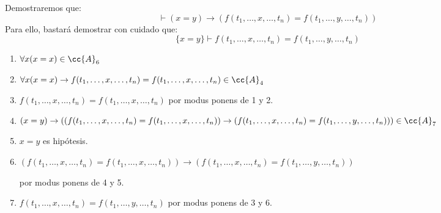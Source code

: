 \begin{ejemplo}
    Demostraremos que:
    \begin{equation*}
        \vdash (x=y) \to (f(t_1,\ldots,x,\ldots,t_n) = f(t_1,\ldots,y,\ldots,t_n))
    \end{equation*}
    Para ello, bastará demostrar con cuidado que:
    \begin{equation*}
        \{x=y\} \vdash f(t_1,\ldots,x,\ldots,t_n) = f(t_1,\ldots,y,\ldots,t_n)
    \end{equation*}
    \begin{enumerate}
        \item $\forall x(x=x)\in \cc{A}_6$ 
        \item $\forall x(x=x)\to f(t_1,\dots,x,\dots,t_n)=f(t_1,\dots,x,\dots,t_n)\in \cc{A}_4$
        \item $f(t_1,\dots,x,\dots,t_n)=f(t_1,\dots,x,\dots,t_n)$ por modus ponens de 1 y 2.
        \item $(x=y)\to ((f(t_1,\dots,x,\dots,t_n)=f(t_1,\dots,x,\dots,t_n))\to (f(t_1,\dots,x,\dots,t_n)=f(t_1,\dots,y,\dots,t_n))) \in \cc{A}_7$
        \item $x=y$ es hipótesis.
        \item $(f(t_1,\ldots,x,\ldots,t_n)=f(t_1,\ldots,x,\ldots,t_n))\to (f(t_1,\ldots,x,\ldots,t_n)=f(t_1,\ldots,y,\ldots,t_n))$ 

            por modus ponens de 4 y 5.
        \item $f(t_1,\ldots,x,\ldots,t_n)=f(t_1,\ldots,y,\ldots,t_n)$ por modus ponens de 3 y 6.
    \end{enumerate}
\end{ejemplo}
